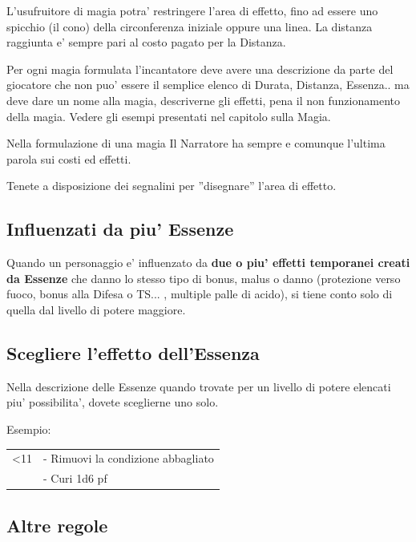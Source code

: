 \documentclass[a4paper,11pt,twoside,openany]{book}
\begin{document}
L'usufruitore di magia potra' restringere l'area di effetto, fino ad essere uno spicchio (il cono) della circonferenza iniziale oppure una linea. La distanza raggiunta e' sempre pari al costo pagato per la Distanza.

Per ogni magia formulata l'incantatore deve avere una descrizione da parte del giocatore che non puo' essere il semplice elenco di Durata, Distanza, Essenza.. ma deve dare un nome alla magia, descriverne gli effetti, pena il non funzionamento della magia. Vedere gli esempi presentati nel capitolo sulla Magia.

Nella formulazione di una magia Il Narratore ha sempre e comunque l'ultima parola sui costi ed effetti.

Tenete a disposizione dei segnalini per ''disegnare'' l'area di effetto.

\subsection{Influenzati da piu' Essenze}

\label{influenzati-da-piu-essenze}

Quando un personaggio e' influenzato da \textbf{due o piu' effetti temporanei creati da Essenze} che danno lo stesso tipo di bonus, malus o danno (protezione verso fuoco, bonus alla Difesa o TS... , multiple palle di acido), si tiene conto solo di quella dal livello di potere maggiore.

\subsection{Scegliere l'effetto dell'Essenza}

\label{scegliere-leffetto-dellessenza}

Nella descrizione delle Essenze quando trovate per un livello di potere elencati piu' possibilita', dovete sceglierne uno solo.

Esempio:

\medskip

\begin{tabular}{L{3cm} L{13cm}}
\toprule
<11 & - Rimuovi la condizione abbagliato\tabularnewline
& - Curi 1d6 pf
\end{tabular}

\subsection{Altre regole}
\end{document}
